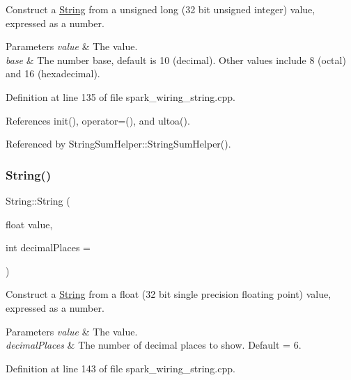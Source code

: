 Construct a \hyperlink{class_string}{String} from a unsigned long (32 bit unsigned integer) value, expressed as a number. 


\begin{DoxyParams}{Parameters}
{\em value} & The value.\\
\hline
{\em base} & The number base, default is 10 (decimal). Other values include 8 (octal) and 16 (hexadecimal). \\
\hline
\end{DoxyParams}


Definition at line 135 of file spark\+\_\+wiring\+\_\+string.\+cpp.



References init(), operator=(), and ultoa().



Referenced by String\+Sum\+Helper\+::\+String\+Sum\+Helper().

\mbox{\label{class_string_adef4f199739444a78803c4043ad3e228}} 
\subsubsection{\texorpdfstring{String()}{String()}\hspace{0.1cm}{\footnotesize\ttfamily [12/13]}}
{\footnotesize\ttfamily String\+::\+String (\begin{DoxyParamCaption}\item[{float}]{value,  }\item[{int}]{decimal\+Places = {} }\end{DoxyParamCaption})\hspace{0.3cm}{\ttfamily [explicit]}}



Construct a \hyperlink{class_string}{String} from a float (32 bit single precision floating point) value, expressed as a number. 


\begin{DoxyParams}{Parameters}
{\em value} & The value.\\
\hline
{\em decimal\+Places} & The number of decimal places to show. Default = 6. \\
\hline
\end{DoxyParams}


Definition at line 143 of file spark\+\_\+wiring\+\_\+string.\+cpp.



